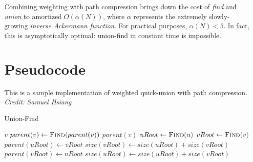 \documentclass{article}
\begin{document}
Combining weighting with path compression brings down the cost of \textit{find} and \textit{union} to amortized $O(\alpha(N))$, where $\alpha$ represents the extremely slowly-growing \textit{inverse Ackermann function}. For practical purposes, $\alpha(N)<5$. In fact, this is asymptotically optimal: union-find in constant time is impossible.


\section{Pseudocode}
This is a sample implementation of weighted quick-union with path compression. \textit{Credit: Samuel Hsiang}


\begin{algorithm}[H]
\caption{Union-Find}
\begin{algorithmic}
		\State \Return $v$
    \EndIf
    \State $parent(v) \gets \Call{Find}{parent(v)}$
    \State \Return $parent(v)$
\EndFunction
{}
	\State $uRoot \gets \Call{Find}{u}$
	\State $vRoot \gets \Call{Find}{v}$
		\State \Return
	\EndIf
    	\State $parent(uRoot) \gets vRoot$
        \State $size(vRoot) \gets size(uRoot) + size(vRoot)$
    \Else
    	\State $parent(vRoot) \gets uRoot$
        \State $size(uRoot) \gets size(uRoot) + size(vRoot)$
    \EndIf
\EndFunction
\end{algorithmic}
\end{algorithm}
\end{document}
